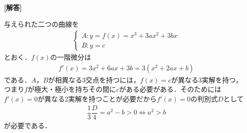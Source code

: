 \documentclass[../../main.tex]{subfiles}
\begin{document}
\begin{oframed}
  
\end{oframed}

{\bf [解答]}

与えられた二つの曲線を
\begin{align}
  \begin{cases}
    A: y = f(x) = x^3+3ax^2+3bx \\
    B: y = c
  \end{cases} \label{eq:1}
\end{align}
とおく．$f(x)$の一階微分は
\begin{align}
  f'(x)=3x^2+6ax+3b=3(x^2+2ax+b) \label{eq:2}
\end{align}
である．$A$，$B$が相異なる3交点を持つには，$f(x)=c$が異なる3実解を持つ，つまり$f$が極大・極小を持ちその間に$c$がある必要がある．そのためには$f'(x)=0$が異なる2実解を持つことが必要だから$f'(x)=0$の判別式$D$として
\begin{align}
  \dfrac{1}{3}\dfrac{D}{4}=a^2-b>0\iff a^2>b
\end{align}
が必要である．
\end{document}
